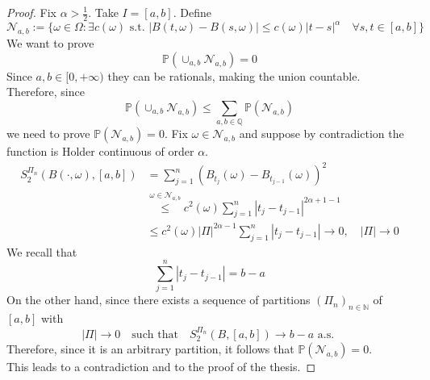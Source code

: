 \begin{ProofBox}
    \begin{proof}
    Fix $\alpha > \frac{1}{2}$. Take $I=[a,b]$. Define 
    \begin{equation*}
        \mathcal{N}_{a,b} := \{\omega \in \Omega: \exists c(\omega) \text{  s.t.  } |B(t,\omega) - B(s,\omega)| \leq c(\omega) |t-s|^\alpha \quad \forall s,t \in [a,b]\}
    \end{equation*}
    We want to prove
    \begin{equation*}
        \mathbb{P}(\cup_{a,b} \mathcal{N}_{a,b}) = 0
    \end{equation*}
    Since $a,b \in [0,+\infty)$ they can be rationals, making the union countable. Therefore, since
    \begin{equation*}
        \mathbb{P}(\cup_{a,b} \mathcal{N}_{a,b}) \leq \sum_{a,b \in \mathbb{Q}}\mathbb{P}(\mathcal{N}_{a,b})
    \end{equation*}
    we need to prove $\mathbb{P}(\mathcal{N}_{a,b})=0$. Fix $\omega \in \mathcal{N}_{a,b}$ and suppose by contradiction the function is Holder continuous of order $\alpha$. 
    \begin{align*}
        S_2^{\Pi_n}(B(\cdot,\omega), [a,b]) &= \sum_{j=1}^n (B_{t_j}(\omega) - B_{t_{j-1}}(\omega))^2\\
        &\stackrel{\omega \in \mathcal{N}_{a,b}}\leq c^2(\omega) \sum_{j=1}^n |t_j - t_{j-1}|^{2\alpha+1-1} \\
        &\leq c^2(\omega) |\Pi|^{2\alpha -1} \sum_{j=1}^n|t_j-t_{j-1}| \rightarrow 0, \quad |\Pi| \rightarrow 0 
    \end{align*}
    We recall that 
    \begin{equation*}
        \sum_{j=1}^n|t_j-t_{j-1}| = b-a
    \end{equation*}
    On the other hand, since there exists a sequence of partitions $(\Pi_n)_{n \in \mathbb{N}}$ of $[a,b]$ with 
    \begin{equation*}
        |\Pi| \rightarrow 0 \quad \text{such that} \quad S_2^{\Pi_n}(B, [a,b]) \rightarrow b-a \text{   a.s. }
    \end{equation*}
    Therefore, since it is an arbitrary partition, it follows that $\mathbb{P}(\mathcal{N}_{a,b})=0$. \\
    This leads to a contradiction and to the proof of the thesis. 
\end{proof}
\end{ProofBox}

\newpage

